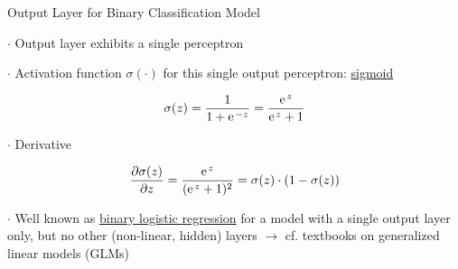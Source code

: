 \documentclass[mathserif, aspectratio=1610]{intbeamer}
\begin{document}
\begin{frame}[t]{Output Layer for Binary Classification Model}

$\cdot$ Output layer exhibits a single perceptron

$\cdot$ Activation function $\sigma(\cdot)$ for this single output perceptron: \underline{sigmoid}

$$\sigma(z) = \frac{1}{1+\e^{-z}} = \frac{\e^{z}}{\e^{z}+1}$$

\begin{center}
\end{center}

$\cdot$ Derivative

$$\frac{\partial \sigma(z)}{\partial z} = \frac{\e^{z}}{(\e^{z}+1)^2} = \sigma(z) \cdot (1-\sigma(z))$$

$\cdot$ Well known as \underline{binary logistic regression} for a model with a single output layer only, but no other (non-linear, hidden) layers $\rightarrow$ cf. textbooks on generalized linear models (GLMs)

\end{frame}
\end{document}
